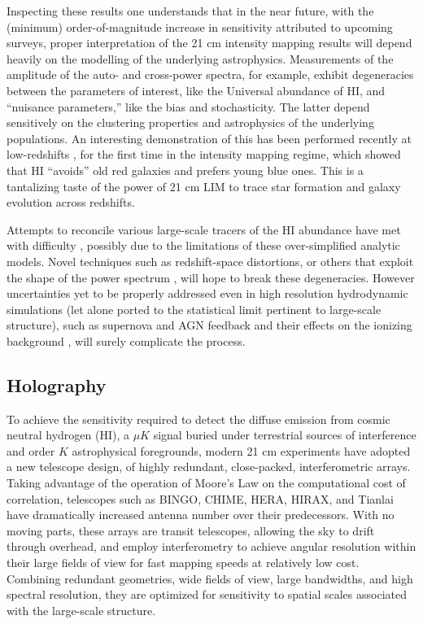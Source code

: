 Inspecting these results one understands that in the near future, with the (minimum) order-of-magnitude increase in sensitivity attributed to upcoming surveys,  proper interpretation of the 21 cm intensity mapping results will depend heavily on the modelling of the underlying astrophysics. Measurements of the amplitude of the auto- and cross-power spectra, for example, exhibit degeneracies between the parameters of interest, like the Universal abundance of HI, and ``nuisance parameters,'' like the bias and stochasticity. The latter depend sensitively on the clustering properties and astrophysics of the underlying populations. An interesting demonstration of this has been performed recently at low-redshifts \cite{andersonetalparkes}, for the first time in the intensity mapping regime, which showed that HI ``avoids'' old red galaxies and prefers young blue ones. This is a tantalizing taste of the power of 21 cm LIM to trace star formation and galaxy evolution across redshifts. 

Attempts to reconcile various large-scale tracers of the HI abundance have met with difficulty \cite{pad2015, castorina2016}, possibly due to the limitations of these over-simplified analytic models. Novel techniques such as redshift-space distortions, or others that exploit the shape of the power spectrum \cite{wolz2017}, will hope to break these degeneracies. However uncertainties yet to be properly addressed even in high resolution hydrodynamic simulations (let alone ported to the statistical limit pertinent to large-scale structure), such as supernova and AGN feedback and their effects on the ionizing background \cite{pontzenbias}, will surely complicate the process. 

\subsection{\label{sec:bg:subsec:hol} Holography}

To achieve the sensitivity required to detect the diffuse emission from cosmic neutral hydrogen (HI), a $\mu K$ signal buried under terrestrial sources of interference and order $K$ astrophysical foregrounds, modern 21 cm experiments have adopted a new telescope design, of highly redundant, close-packed, interferometric arrays. Taking advantage of the operation of Moore's Law on the computational cost of correlation, telescopes such as BINGO, CHIME, HERA, HIRAX, and Tianlai have dramatically increased antenna number over their predecessors. With no moving parts, these arrays are transit telescopes, allowing the sky to drift through overhead, and employ interferometry to achieve angular resolution within their large fields of view for fast mapping speeds at relatively low cost. Combining redundant geometries, wide fields of view, large bandwidths, and high spectral resolution, they are optimized for sensitivity to spatial scales associated with the large-scale structure.

